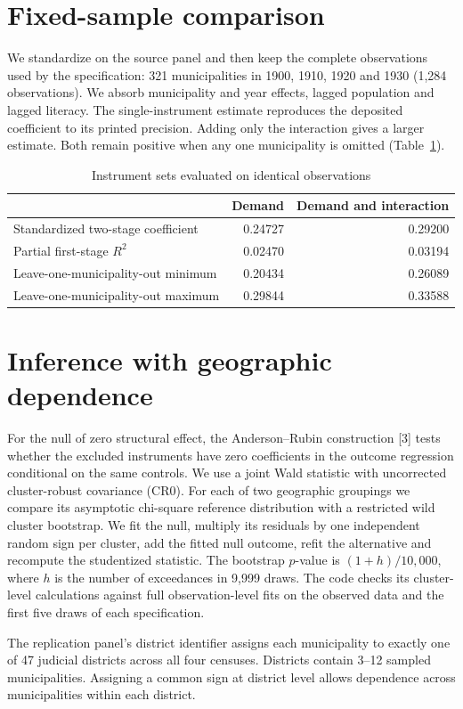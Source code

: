 \documentclass[10pt]{article}
\begin{document}
\section{Fixed-sample comparison}
We standardize on the source panel and then keep the complete observations used by the specification: 321 municipalities in 1900, 1910, 1920 and 1930 (1,284 observations). We absorb municipality and year effects, lagged population and lagged literacy. The single-instrument estimate reproduces the deposited coefficient to its printed precision. Adding only the interaction gives a larger estimate. Both remain positive when any one municipality is omitted (Table~\ref{tab:fits}).
\begin{table}[h]\centering
\caption{Instrument sets evaluated on identical observations}\label{tab:fits}
\begin{tabular}{lrr}\toprule
 & Demand & Demand and interaction\\\midrule
Standardized two-stage coefficient & 0.24727 & 0.29200\\
Partial first-stage $R^2$ & 0.02470 & 0.03194\\
Leave-one-municipality-out minimum & 0.20434 & 0.26089\\
Leave-one-municipality-out maximum & 0.29844 & 0.33588\\\bottomrule
\end{tabular}
\end{table}
\newpage
\section{Inference with geographic dependence}
For the null of zero structural effect, the Anderson--Rubin construction [3] tests whether the excluded instruments have zero coefficients in the outcome regression conditional on the same controls. We use a joint Wald statistic with uncorrected cluster-robust covariance (CR0). For each of two geographic groupings we compare its asymptotic chi-square reference distribution with a restricted wild cluster bootstrap. We fit the null, multiply its residuals by one independent random sign per cluster, add the fitted null outcome, refit the alternative and recompute the studentized statistic. The bootstrap $p$-value is $(1+h)/10{,}000$, where $h$ is the number of exceedances in 9,999 draws. The code checks its cluster-level calculations against full observation-level fits on the observed data and the first five draws of each specification.

The replication panel's district identifier assigns each municipality to exactly one of 47 judicial districts across all four censuses. Districts contain 3--12 sampled municipalities. Assigning a common sign at district level allows dependence across municipalities within each district.
\end{document}
